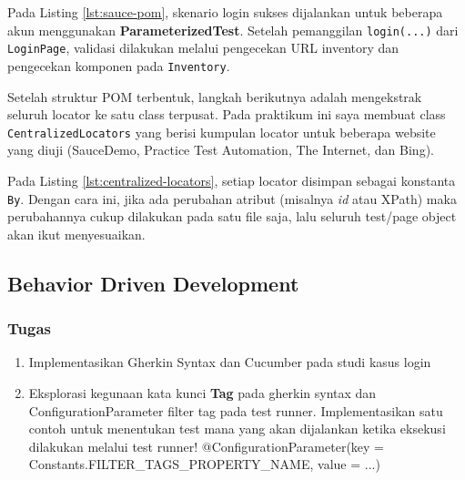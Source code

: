 \documentclass[a4paper,oneside,11pt]{book}
\newcounter{subsubsubsection}[subsubsection]
\begin{document}


\par Pada Listing \ref{lst:sauce-pom}, skenario login sukses dijalankan untuk beberapa akun menggunakan \textbf{ParameterizedTest}. Setelah pemanggilan \texttt{login(...)} dari \texttt{LoginPage}, validasi dilakukan melalui pengecekan URL inventory dan pengecekan komponen pada \texttt{Inventory}.

\par Setelah struktur POM terbentuk, langkah berikutnya adalah mengekstrak seluruh locator ke satu class terpusat. Pada praktikum ini saya membuat class \texttt{CentralizedLocators} yang berisi kumpulan locator untuk beberapa website yang diuji (SauceDemo, Practice Test Automation, The Internet, dan Bing).



\par Pada Listing \ref{lst:centralized-locators}, setiap locator disimpan sebagai konstanta \texttt{By}. Dengan cara ini, jika ada perubahan atribut (misalnya \textit{id} atau XPath) maka perubahannya cukup dilakukan pada satu file saja, lalu seluruh test/page object akan ikut menyesuaikan.

\subsection{Behavior Driven Development}
\subsubsection{Tugas}
\begin{enumerate}
  \item Implementasikan Gherkin Syntax dan Cucumber pada studi kasus login
  \item Eksplorasi kegunaan kata kunci \textbf{Tag} pada gherkin syntax dan ConfigurationParameter filter tag pada test runner. Implementasikan satu contoh untuk menentukan test mana yang akan dijalankan ketika eksekusi dilakukan melalui test runner! @ConfigurationParameter(key = Constants.FILTER\_TAGS\_PROPERTY\_NAME, value = ...)
\end{enumerate}
\end{document}

